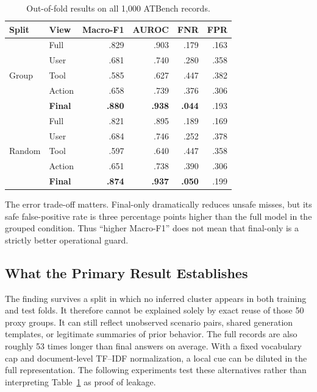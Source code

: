 \documentclass[10pt,twocolumn,twoside]{article}
\newcommand{\mf}{Macro-F1}
\begin{document}
\begin{table}[t]
\centering
\caption{Out-of-fold results on all 1,000 ATBench records.}
\label{tab:main}
\scriptsize
\setlength{\tabcolsep}{3.1pt}
\begin{tabular}{llrrrr}
\toprule
Split & View & \mf{} & AUROC & FNR & FPR \\
\midrule
\multirow{5}{*}{Group}
 & Full & .829 & .903 & .179 & .163 \\
 & User & .681 & .740 & .280 & .358 \\
 & Tool & .585 & .627 & .447 & .382 \\
 & Action & .658 & .739 & .376 & .306 \\
 & \textbf{Final} & \textbf{.880} & \textbf{.938} & \textbf{.044} & .193 \\
\midrule
\multirow{5}{*}{Random}
 & Full & .821 & .895 & .189 & .169 \\
 & User & .684 & .746 & .252 & .378 \\
 & Tool & .597 & .640 & .447 & .358 \\
 & Action & .651 & .738 & .390 & .306 \\
 & \textbf{Final} & \textbf{.874} & \textbf{.937} & \textbf{.050} & .199 \\
\bottomrule
\end{tabular}
\end{table}

The error trade-off matters. Final-only dramatically reduces unsafe misses, but its
safe false-positive rate is three percentage points higher than the full model in
the grouped condition. Thus ``higher Macro-F1'' does not mean that final-only is a
strictly better operational guard.

\subsection{What the Primary Result Establishes}
The finding survives a split in which no inferred cluster appears in both training
and test folds. It therefore cannot be explained solely by exact reuse of those 50
proxy groups. It can still reflect unobserved scenario pairs, shared generation
templates, or legitimate summaries of prior behavior. The full records are also
roughly 53 times longer than final answers on average. With a fixed vocabulary cap
and document-level TF--IDF normalization, a local cue can be diluted in the full
representation. The following experiments test these alternatives rather than
interpreting Table~\ref{tab:main} as proof of leakage.
\end{document}
